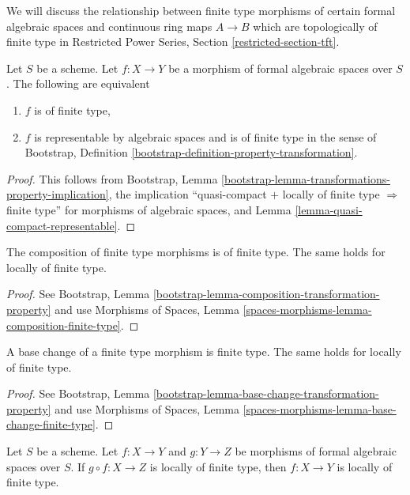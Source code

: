 \noindent
We will discuss the relationship between finite type morphisms of
certain formal algebraic spaces and
continuous ring maps $A \to B$ which are topologically of finite type
in Restricted Power Series, Section \ref{restricted-section-tft}.

\begin{lemma}
\label{lemma-characterize-finite-type}
Let $S$ be a scheme. Let $f : X \to Y$ be a morphism of formal algebraic
spaces over $S$. The following are equivalent
\begin{enumerate}
\item $f$ is of finite type,
\item $f$ is representable by algebraic spaces and is of finite type in
the sense of
Bootstrap, Definition \ref{bootstrap-definition-property-transformation}.
\end{enumerate}
\end{lemma}

\begin{proof}
This follows from Bootstrap, Lemma
\ref{bootstrap-lemma-transformations-property-implication},
the implication ``quasi-compact $+$ locally of finite type
$\Rightarrow$ finite type'' for morphisms of algebraic spaces, and
Lemma \ref{lemma-quasi-compact-representable}.
\end{proof}

\begin{lemma}
\label{lemma-composition-finite-type}
The composition of finite type morphisms is of finite type.
The same holds for locally of finite type.
\end{lemma}

\begin{proof}
See Bootstrap, Lemma \ref{bootstrap-lemma-composition-transformation-property}
and use Morphisms of Spaces, Lemma
\ref{spaces-morphisms-lemma-composition-finite-type}.
\end{proof}

\begin{lemma}
\label{lemma-base-change-finite-type}
A base change of a finite type morphism is finite type.
The same holds for locally of finite type.
\end{lemma}

\begin{proof}
See Bootstrap, Lemma \ref{bootstrap-lemma-base-change-transformation-property}
and use Morphisms of Spaces, Lemma
\ref{spaces-morphisms-lemma-base-change-finite-type}.
\end{proof}

\begin{lemma}
\label{lemma-permanence-finite-type}
Let $S$ be a scheme. Let $f : X \to Y$ and $g : Y \to Z$ be morphisms of
formal algebraic spaces over $S$. If $g \circ f : X \to Z$ is locally of
finite type, then $f : X \to Y$ is locally of finite type.
\end{lemma}


